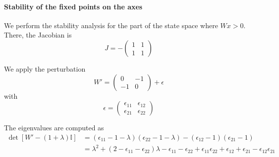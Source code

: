 \documentclass{article} %
\newcounter{ct}
\newcommand{\win}{\vW_{\text{in}}}
\newcommand{\wout}{\vW_{\text{out}}}
\newcommand{\bout}{\vb_{\text{out}}}
\theoremstyle{definition}
\theoremstyle{remark}
\begin{document}



%



\paragraph{Stability of the fixed points on the axes}
We perform the stability analysis for the part of the state space where \(Wx>0\).
There, the Jacobian is
\begin{equation}
J = -
\begin{pmatrix}
1  &  1 \\
1  &  1
\end{pmatrix}
\end{equation}

We apply the perturbation
\begin{equation}
W' =
\begin{pmatrix}
0  &  -1 \\
-1  &  0
\end{pmatrix}
+ \epsilon
\end{equation}
with
\begin{equation}
\epsilon =
\begin{pmatrix}
\epsilon_{11}  &  \epsilon_{12} \\
\epsilon_{21}  &  \epsilon_{22}
\end{pmatrix}
\end{equation}

The eigenvalues are computed as
\begin{align*}
\det [W' -(1+\lambda)\mathbb{I}] &= (\epsilon_{11}-1-\lambda)(\epsilon_{22}-1-\lambda)-(\epsilon_{12}-1)(\epsilon_{21}-1)\\
&=\lambda^2 + (2-\epsilon_{11}-\epsilon_{22})\lambda -\epsilon_{11}-\epsilon_{22}+\epsilon_{11}\epsilon_{22} +\epsilon_{12} + \epsilon_{21} - \epsilon_{12}\epsilon_{21}
\end{align*}
\end{document}

